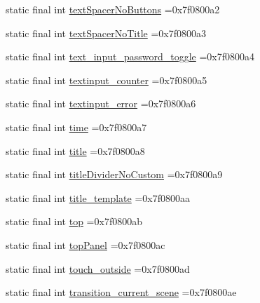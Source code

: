 \begin{DoxyCompactItemize}
\item 
static final int \mbox{\hyperlink{classbr_1_1unb_1_1cic_1_1mp_1_1marketmaster_1_1test_1_1R_1_1id_aa69e4167ebd6d5e63e7b564458294ee9}{text\+Spacer\+No\+Buttons}} =0x7f0800a2
\item 
static final int \mbox{\hyperlink{classbr_1_1unb_1_1cic_1_1mp_1_1marketmaster_1_1test_1_1R_1_1id_a9787364d9927a14519c1d2d6006239c8}{text\+Spacer\+No\+Title}} =0x7f0800a3
\item 
static final int \mbox{\hyperlink{classbr_1_1unb_1_1cic_1_1mp_1_1marketmaster_1_1test_1_1R_1_1id_a550c8c2da0d0a057562c72f2cc81c596}{text\+\_\+input\+\_\+password\+\_\+toggle}} =0x7f0800a4
\item 
static final int \mbox{\hyperlink{classbr_1_1unb_1_1cic_1_1mp_1_1marketmaster_1_1test_1_1R_1_1id_a5011c434924662f55096d88751b96b86}{textinput\+\_\+counter}} =0x7f0800a5
\item 
static final int \mbox{\hyperlink{classbr_1_1unb_1_1cic_1_1mp_1_1marketmaster_1_1test_1_1R_1_1id_a73b359572e823e2448b954959b35b362}{textinput\+\_\+error}} =0x7f0800a6
\item 
static final int \mbox{\hyperlink{classbr_1_1unb_1_1cic_1_1mp_1_1marketmaster_1_1test_1_1R_1_1id_aa969992201f65fd02dc163d36ad9e175}{time}} =0x7f0800a7
\item 
static final int \mbox{\hyperlink{classbr_1_1unb_1_1cic_1_1mp_1_1marketmaster_1_1test_1_1R_1_1id_a8b711a2744180aa9e101b1b0f30b37d2}{title}} =0x7f0800a8
\item 
static final int \mbox{\hyperlink{classbr_1_1unb_1_1cic_1_1mp_1_1marketmaster_1_1test_1_1R_1_1id_aa33459e628899ba4ed3c5488717cfc42}{title\+Divider\+No\+Custom}} =0x7f0800a9
\item 
static final int \mbox{\hyperlink{classbr_1_1unb_1_1cic_1_1mp_1_1marketmaster_1_1test_1_1R_1_1id_a4da3db5ac96cfa47c054a021feebb8a6}{title\+\_\+template}} =0x7f0800aa
\item 
static final int \mbox{\hyperlink{classbr_1_1unb_1_1cic_1_1mp_1_1marketmaster_1_1test_1_1R_1_1id_a738587994fe6f521381618abea26295b}{top}} =0x7f0800ab
\item 
static final int \mbox{\hyperlink{classbr_1_1unb_1_1cic_1_1mp_1_1marketmaster_1_1test_1_1R_1_1id_a9c4ca12b2beb4ad6df64595f119a6801}{top\+Panel}} =0x7f0800ac
\item 
static final int \mbox{\hyperlink{classbr_1_1unb_1_1cic_1_1mp_1_1marketmaster_1_1test_1_1R_1_1id_a2f98fd9bd9b1086f93862b11825eeeaf}{touch\+\_\+outside}} =0x7f0800ad
\item 
static final int \mbox{\hyperlink{classbr_1_1unb_1_1cic_1_1mp_1_1marketmaster_1_1test_1_1R_1_1id_a10df0bd8e757f343893410fe5ef1397f}{transition\+\_\+current\+\_\+scene}} =0x7f0800ae

\end{DoxyCompactItemize}
